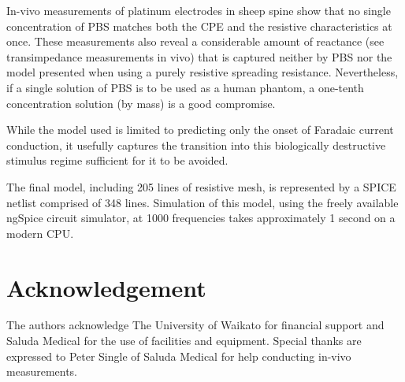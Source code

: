 \documentclass[journal, a4paper]{IEEEtran}
\begin{document}
In-vivo measurements of platinum electrodes in sheep spine show that no single concentration of PBS matches both the CPE and the resistive characteristics at once. {\color{blue} These measurements also reveal a considerable amount of reactance (see transimpedance measurements in vivo) that is captured neither by PBS nor the model presented when using a purely resistive spreading resistance.} Nevertheless, {\color{blue}if a single solution of PBS is to be used as a human phantom, a one-tenth concentration solution (by mass)} is a good compromise.

{
    \color{blue}
    While the model used is limited to predicting only the onset of Faradaic current conduction, it usefully captures the transition into this biologically destructive stimulus regime sufficient for it to be avoided. 
    
    {\color{blue}The final model, including 205 lines of resistive mesh, is represented by a SPICE netlist comprised of 348 lines. Simulation of this model, using the freely available ngSpice circuit simulator, at 1000 frequencies takes approximately 1 second on a modern CPU.} 
}

\section*{Acknowledgement}
The authors acknowledge The University of Waikato for financial support and Saluda Medical for the use of facilities and equipment. {\color{blue}Special thanks are expressed to Peter Single of Saluda Medical for help conducting in-vivo measurements.}
\end{document}

